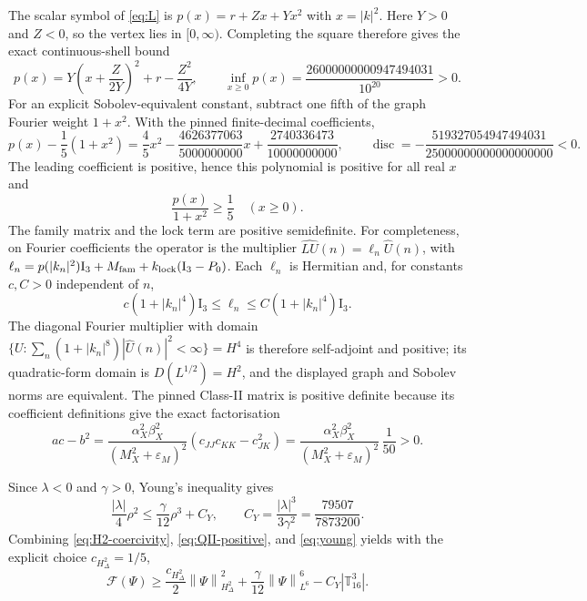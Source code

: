 \documentclass[11pt]{article}
\numberwithin{equation}{section}
\theoremstyle{definition}
\newcommand{\T}{\mathbb T}
\newcommand{\cF}{\mathcal F}
\newcommand{\Id}{\mathrm I}
\newcommand{\norm}[1]{\left\lVert#1\right\rVert}
\newcommand{\eps}{\varepsilon}
\begin{document}
The scalar symbol of \eqref{eq:L} is $p(x)=r+Zx+Yx^2$ with $x=|k|^2$.
Here $Y>0$ and $Z<0$, so the vertex lies in $[0,\infty)$.  Completing the
square therefore gives the exact continuous-shell bound
\begin{equation}
 p(x)=Y\left(x+\frac{Z}{2Y}\right)^2+r-\frac{Z^2}{4Y},\qquad
 \inf_{x\ge0}p(x)=\frac{26000000000947494031}{10^{20}}>0.
 \label{eq:symbol-positive}
\end{equation}
For an explicit Sobolev-equivalent constant, subtract one fifth of the graph
Fourier weight $1+x^2$.  With the pinned finite-decimal coefficients,
\begin{equation}
 p(x)-\frac15(1+x^2)=\frac45x^2-\frac{4626377063}{5000000000}x
       +\frac{2740336473}{10000000000},\qquad
 \operatorname{disc}=-\frac{519327054947494031}{25000000000000000000}<0.
 \label{eq:H2-polynomial}
\end{equation}
The leading coefficient is positive, hence this polynomial is positive for
all real $x$ and
\begin{equation}
 \frac{p(x)}{1+x^2}\ge\frac15\quad(x\ge0).
 \label{eq:H2-coercivity}
\end{equation}
The family matrix and the lock term are positive semidefinite.  For
completeness, on Fourier coefficients the operator is the multiplier
\(\widehat{LU}(n)=\ell_n\widehat U(n)\), with
\(\ell_n=p(|k_n|^2)\Id_3+M_{\rm fam}+k_{\rm lock}(\Id_3-P_0)\).
Each \(\ell_n\) is Hermitian and, for constants \(c,C>0\) independent of
\(n\),
\[
 c(1+|k_n|^4)\Id_3\le \ell_n\le C(1+|k_n|^4)\Id_3.
\]
The diagonal Fourier multiplier with domain
\(\{U:\sum_n(1+|k_n|^8)|\widehat U(n)|^2<\infty\}=H^4\) is therefore
self-adjoint and positive; its quadratic-form domain is
\(D(L^{1/2})=H^2\), and the displayed graph and Sobolev norms are equivalent.
The pinned Class-II matrix is positive definite because its coefficient
definitions give the exact factorisation
\begin{equation}
 ac-b^2=\frac{\alpha_X^2\beta_X^2}{(M_X^2+\eps_M)^2}
       (c_{JJ}c_{KK}-c_{JK}^2)
 =\frac{\alpha_X^2\beta_X^2}{(M_X^2+\eps_M)^2}\,\frac1{50}>0.
 \label{eq:QII-positive}
\end{equation}

Since $\lambda<0$ and $\gamma>0$, Young's inequality gives
\begin{equation}
 \frac{|\lambda|}{4}\rho^2\le \frac\gamma{12}\rho^3+C_Y,\qquad
 C_Y=\frac{|\lambda|^3}{3\gamma^2}=\frac{79507}{7873200}.
 \label{eq:young}
\end{equation}
Combining \eqref{eq:H2-coercivity}, \eqref{eq:QII-positive}, and
\eqref{eq:young} yields with the explicit choice $c_{H^2_\Delta}=1/5$,
\begin{equation}
 \cF(\Psi)\ge \frac{c_{H^2_\Delta}}2\norm{\Psi}_{H^2_\Delta}^2
       +\frac\gamma{12}\norm{\Psi}_{L^6}^6-C_Y|\T^3_{16}|.
 \label{eq:energy-coercivity}
\end{equation}
\end{document}
